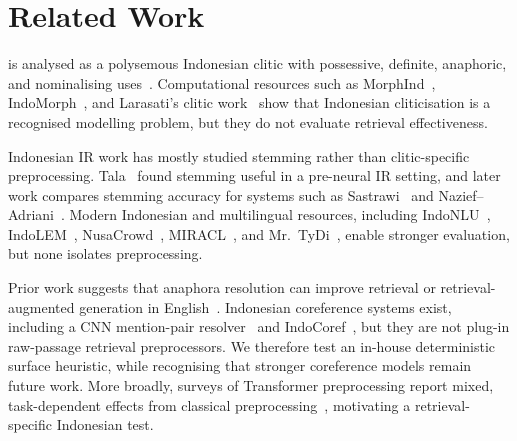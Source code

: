 \section{Related Work}
\label{sec:related}

 is analysed as a polysemous Indonesian clitic with possessive, definite, anaphoric, and nominalising uses~\cite{denistia2021morphology}. Computational resources such as MorphInd~\cite{morphind_larasati}, IndoMorph~\cite{indomorph2025}, and Larasati's clitic work~\cite{larasati2012clitics} show that Indonesian cliticisation is a recognised modelling problem, but they do not evaluate retrieval effectiveness.

Indonesian IR work has mostly studied stemming rather than clitic-specific preprocessing. Tala~\cite{tala2003stemming} found stemming useful in a pre-neural IR setting, and later work compares stemming accuracy for systems such as Sastrawi~\cite{sastrawi} and Nazief--Adriani~\cite{nazief1996indonesian}. Modern Indonesian and multilingual resources, including IndoNLU~\cite{wilie2020indonlu}, IndoLEM~\cite{koto2020indolem}, NusaCrowd~\cite{cahyawijaya2023nusacrowd}, MIRACL~\cite{zhang2023miracl}, and Mr.\ TyDi~\cite{zhang2021mrtydi}, enable stronger evaluation, but none isolates  preprocessing.

Prior work suggests that anaphora resolution can improve retrieval or retrieval-augmented generation in English~\cite{mitkov2002anaphora,jang2025coref}. Indonesian coreference systems exist, including a CNN mention-pair resolver~\cite{auliarachman2020coref} and IndoCoref~\cite{artari2021indocoref}, but they are not plug-in raw-passage retrieval preprocessors. We therefore test an in-house deterministic surface heuristic, while recognising that stronger coreference models remain future work. More broadly, surveys of Transformer preprocessing report mixed, task-dependent effects from classical preprocessing~\cite{camacho2023preprocessing}, motivating a retrieval-specific Indonesian test.
